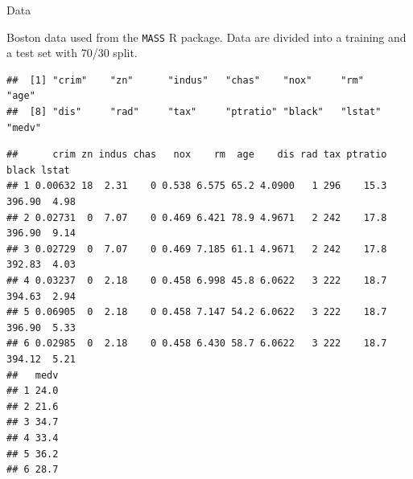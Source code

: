 \documentclass[
  ignorenonframetext,
]{beamer}
\begin{document}
\begin{frame}[fragile]

\begin{block}{Data}

Boston data used from the \texttt{MASS} R package. Data are divided into
a training and a test set with 70/30 split.

\begin{verbatim}
##  [1] "crim"    "zn"      "indus"   "chas"    "nox"     "rm"      "age"    
##  [8] "dis"     "rad"     "tax"     "ptratio" "black"   "lstat"   "medv"
\end{verbatim}

\begin{verbatim}
##      crim zn indus chas   nox    rm  age    dis rad tax ptratio  black lstat
## 1 0.00632 18  2.31    0 0.538 6.575 65.2 4.0900   1 296    15.3 396.90  4.98
## 2 0.02731  0  7.07    0 0.469 6.421 78.9 4.9671   2 242    17.8 396.90  9.14
## 3 0.02729  0  7.07    0 0.469 7.185 61.1 4.9671   2 242    17.8 392.83  4.03
## 4 0.03237  0  2.18    0 0.458 6.998 45.8 6.0622   3 222    18.7 394.63  2.94
## 5 0.06905  0  2.18    0 0.458 7.147 54.2 6.0622   3 222    18.7 396.90  5.33
## 6 0.02985  0  2.18    0 0.458 6.430 58.7 6.0622   3 222    18.7 394.12  5.21
##   medv
## 1 24.0
## 2 21.6
## 3 34.7
## 4 33.4
## 5 36.2
## 6 28.7
\end{verbatim}

\end{block}

\end{frame}
\end{document}
